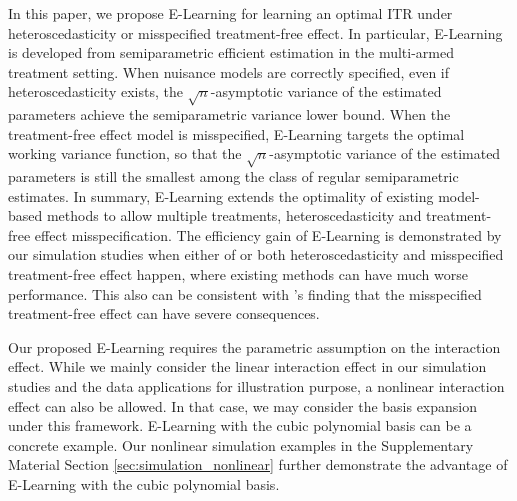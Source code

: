 \documentclass[11pt]{article}
\theoremstyle{definition}
\theoremstyle{remark}
\newcommand{\bX}{\bm{X}}
\newcommand{\bbeta}{\bm{\beta}}
\begin{document}
In this paper, we propose E-Learning for learning an optimal ITR under heteroscedasticity or misspecified treatment-free effect. In particular, E-Learning is developed from semiparametric efficient estimation in the multi-armed treatment setting. When nuisance models are correctly specified, even if heteroscedasticity exists, the $ \sqrt{n} $-asymptotic variance of the estimated parameters achieve the semiparametric variance lower bound. When the treatment-free effect model is misspecified, E-Learning targets the optimal working variance function, so that the $ \sqrt{n} $-asymptotic variance of the estimated parameters is still the smallest among the class of regular semiparametric estimates. In summary, E-Learning extends the optimality of existing model-based methods to allow multiple treatments, heteroscedasticity and treatment-free effect misspecification. The efficiency gain of E-Learning is demonstrated by our simulation studies when either of or both heteroscedasticity and misspecified treatment-free effect happen, where existing methods can have much worse performance. This also can be consistent with \citet{kang2007demystifying}'s finding that the misspecified treatment-free effect can have severe consequences.
	

Our proposed E-Learning requires the parametric assumption on the interaction effect. While we mainly consider the linear interaction effect in our simulation studies and the data applications for illustration purpose, a nonlinear interaction effect can also be allowed. In that case, we may consider the basis expansion under this framework. E-Learning with the cubic polynomial basis can be a concrete example. Our nonlinear simulation examples in the Supplementary Material Section \ref{sec:simulation_nonlinear} further demonstrate the advantage of E-Learning with the cubic polynomial basis.
\end{document}

